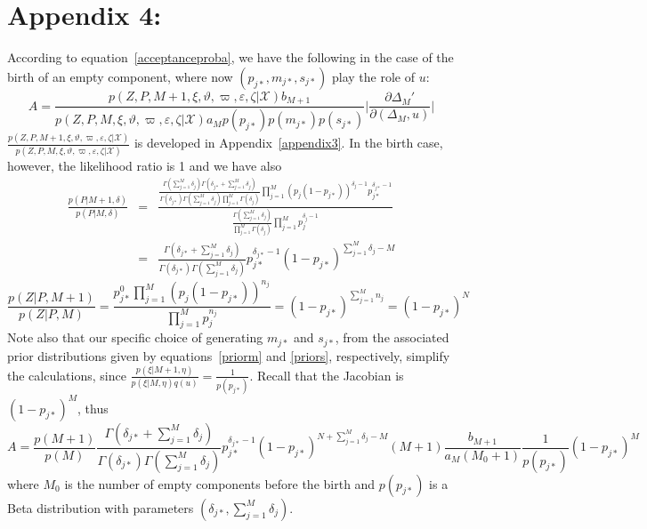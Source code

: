 \documentclass[journal,10pt]{elsart}
\begin{document}
\section*{Appendix 4:}\label{appendix5}
According to equation~\ref{acceptanceproba}, we have the following in the case of the birth of an empty component, where now $(p_{j*},m_{j*},s_{j*})$ play the role of $u$:
\begin{equation}
A=\frac{p(Z,P,M+1,\xi,\vartheta,\varpi,\varepsilon,\zeta|\mathcal{X})b_{M+1}}{p(Z,P,M,\xi,\vartheta,\varpi,\varepsilon,\zeta|\mathcal{X})a_{M}p(p_{j*})p(m_{j*})p(s_{j*})}\bigg|\frac{\partial\Delta_M'}{\partial(\Delta_M,u)}\bigg|
\end{equation}
$\frac{p(Z,P,M+1,\xi,\vartheta,\varpi,\varepsilon,\zeta|\mathcal{X})}{p(Z,P,M,\xi,\vartheta,\varpi,\varepsilon,\zeta|\mathcal{X})}$ is developed in Appendix~\ref{appendix3}. In the birth case, however, the likelihood ratio is 1 and we have also
\begin{eqnarray} \frac{p(P|M+1,\delta)}{p(P|M,\delta)}&=&\frac{\frac{\Gamma(\sum_{j=1}^{M}\delta_j)\Gamma(\delta_{j*}+\sum_{j=1}^{M}\delta_j)}{\Gamma(\delta_{j*})\Gamma(\sum_{j=1}^{M}\delta_j)\prod_{j=1}^{M}\Gamma(\delta_j)}\prod_{j=1}^{M}(p_j(1-p_{j*}))^{\delta_j-1}p_{j*}^{\delta_{j*}-1}}{\frac{\Gamma(\sum_{j=1}^M\delta_j)}{\prod_{j=1}^{M}\Gamma(\delta_j)}\prod_{j=1}^{M}p_j^{\delta_j-1}}
\\\nonumber&=&\frac{\Gamma(\delta_{j*}+\sum_{j=1}^{M}\delta_j)}{\Gamma(\delta_{j*})\Gamma(\sum_{j=1}^{M}\delta_j)}p_{j*}^{\delta_{j*}-1}(1-p_{j*})^{\sum_{j=1}^M\delta_j-M}\end{eqnarray}
 \begin{equation}
\frac{p(Z|P,M+1)}{p(Z|P,M)}=\frac{p_{j*}^0\prod_{j=1}^{M} (p_j(1-p_{j*}))^{n_j}}{\prod_{j=1}^{M} p_j^{n_j}}=(1-p_{j*})^{\sum_{j=1}^{M}n_j}=(1-p_{j*})^N
\end{equation}
Note also that our specific choice of generating $m_{j*}$ and $s_{j*}$, from the associated prior distributions
given by equations~\ref{priorm} and \ref{priors}, respectively, simplify the calculations, since $\frac{p(\xi|M+1,\eta)}{p(\xi|M,\eta)q(u)}=\frac{1}{p(p_{j*})}$.
Recall that the Jacobian is  $(1-p_{j*})^M$, thus
\begin{equation}
A=\frac{p(M+1)}{p(M)}\frac{\Gamma(\delta_{j*}+\sum_{j=1}^{M}\delta_j)}{\Gamma(\delta_{j*})\Gamma(\sum_{j=1}^{M}\delta_j)}p_{j*}^{\delta_{j*}-1}(1-p_{j*})^{N+\sum_{j=1}^M\delta_j-M}(M+1)\frac{b_{M+1}}{a_M(M_0+1)}\frac{1}{p(p_{j*})}(1-p_{j*})^M
\end{equation}
where $M_0$ is the number of empty components before the birth and $p(p_{j*})$ is a Beta distribution with parameters $(\delta_{j*},\sum_{j=1}^M \delta_j)$.
\end{document}
